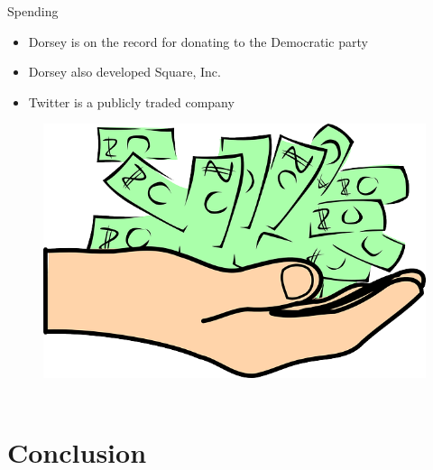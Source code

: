 \documentclass[xcolor=svgnames,handout]{beamer}
\begin{document}
\begin{frame}{Spending}
	\begin{itemize}
		\item Dorsey is on the record for donating to the Democratic party~\cite{opensecrets.org2010}
		\item Dorsey also developed Square, Inc.~\cite{square2010}~\cite{jessihempel2011}
		\item Twitter is a publicly traded company~\cite{leokelion2013}~\cite{aaronpressman2013}~\cite{nyse2016}
	\end{itemize}
	\begin{figure}[h]
		\centering
		\includegraphics[scale=0.10]{spending.png}
		\caption{~\cite{clkerfreevectorimages}}
	\end{figure}
\end{frame}

\section{Conclusion}
\end{document}
